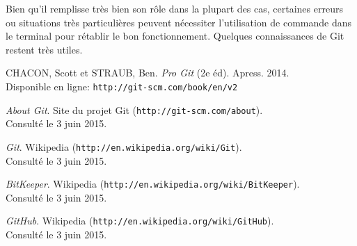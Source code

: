 \documentclass[11pt,a4paper]{article}
\begin{document}

Bien qu'il remplisse très bien son rôle dans la plupart des cas, certaines erreurs ou situations très particulières peuvent nécessiter l'utilisation de commande dans le terminal pour rétablir le bon fonctionnement.
Quelques connaissances de Git restent très utiles.

\pagebreak
\begin{thebibliography}{1}

	CHACON, Scott et STRAUB, Ben. {\em Pro Git} (2e éd). Apress. 2014. \\
	Disponible en ligne: {\tt http://git-scm.com/book/en/v2}

	{\em About Git}. Site du projet Git ({\tt http://git-scm.com/about}). \\
	Consulté le 3 juin 2015.

	{\em Git}. Wikipedia ({\tt http://en.wikipedia.org/wiki/Git}). \\
	Consulté le 3 juin 2015.

	{\em BitKeeper}. Wikipedia ({\tt http://en.wikipedia.org/wiki/BitKeeper}). \\
	Consulté le 3 juin 2015.

	{\em GitHub}. Wikipedia ({\tt http://en.wikipedia.org/wiki/GitHub}). \\
	Consulté le 3 juin 2015.
	
\end{thebibliography}
\end{document}
